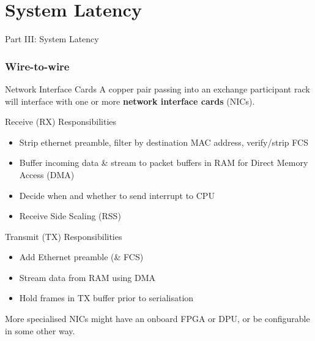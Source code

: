 \documentclass{beamer}
\newif\ifhasdiagram
\newcommand{\sectiondiagram}[1]{%
    \def\insertsdiagram{#1}%
    \hasdiagramtrue
}
\newcommand{\sectionquote}[1]{%
    \def\insertsquote{\small #1}%
}
\newcommand{\insertsdiagram}{}
\newcommand{\insertsquote}{}
\renewcommand{\insertsquote}{}
\renewcommand{\insertsdiagram}{}
\begin{document}
\part{System Latency}
\begin{frame}{Part III: System Latency}
	\tableofcontents[part=3]
\end{frame}

\sectiondiagram{network}
\sectionquote{``In the fields of observation chance favours only the prepared mind.'' Louis Pasteur}
\section{Wire-to-wire}
\begin{frame}{Network Interface Cards}
	A copper pair passing into an exchange participant rack will interface with one or more \textbf{network interface cards} (NICs).%

	\begin{block}{Receive (RX) Responsibilities}
		\begin{itemize}
			\item Strip ethernet preamble, filter by destination MAC address, verify/strip FCS
			\item Buffer incoming data \& stream to packet buffers in RAM for Direct Memory Access (DMA)
			\item Decide when and whether to send interrupt to CPU
			\item Receive Side Scaling (RSS)
		\end{itemize}
	\end{block}

	\begin{block}{Transmit (TX) Responsibilities}
		\begin{itemize}
			\item Add Ethernet preamble (\& FCS)
			\item Stream data from RAM using DMA
			\item Hold frames in TX buffer prior to serialisation
		\end{itemize}
	\end{block}

	More specialised NICs might have an onboard FPGA or DPU, or be configurable in some other way.
\end{frame}
\end{document}
